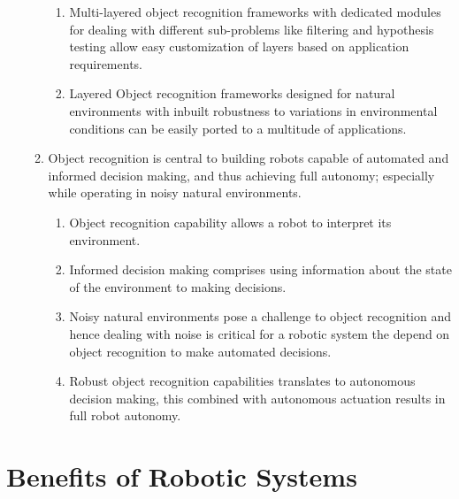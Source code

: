 \documentclass {udthesis}
\begin{document}
\begin{enumerate}[label=Chapter \arabic*:]
\begin{enumerate}[label=Section \arabic*:, start=0]
\begin{enumerate}[label=Para \arabic*:, start=1]
      \item Multi-layered object recognition frameworks with dedicated modules for dealing with different sub-problems like filtering and hypothesis testing allow easy customization of layers based on application requirements.
      
      \item Layered Object recognition frameworks designed for natural environments with inbuilt robustness to variations in environmental conditions can be easily ported to a multitude of applications. 
      
    \end{enumerate}
  
  \item Object recognition is central to building robots capable of automated and informed decision making, and thus achieving full autonomy; especially while operating in noisy natural environments.

    \begin{enumerate}[label=Para \arabic*:, start=1]
      
      \item Object recognition capability allows a robot to interpret its environment.
      
      \item Informed decision making  comprises using information about the state of the environment to making decisions.
      
      \item Noisy natural environments pose a challenge to object recognition and hence dealing with noise is critical for a robotic system the depend on object recognition to make automated decisions.
      
      \item Robust object recognition capabilities translates to autonomous decision making, this combined with autonomous actuation
      results in full robot autonomy.

    \end{enumerate}
    
\end{enumerate}
\end{enumerate}

\section{Benefits of Robotic Systems}
\end{document}

